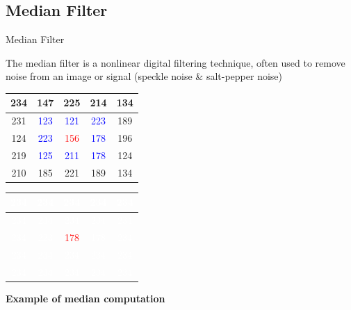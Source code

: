 \documentclass{beamer}
\begin{document}
\subsection{Median Filter}
\begin{frame}{Median Filter}

The median filter is a nonlinear digital filtering technique, often used to remove noise from an image or signal (speckle noise \& salt-pepper noise)




\begin{center}
		\begin{tabular}{|c|c|c|c|c|}
		\hline 
		234 & 147 & 225 & 214 & 134 \\ 
		\hline 
		231 & \textcolor{blue}{123} & \textcolor{blue}{121} & \textcolor{blue}{223} & 189 \\ 
		\hline 
		124 & \textcolor{blue}{223} & \textcolor{red}{156} & \textcolor{blue}{178} & 196 \\ 
		\hline 
		219 & \textcolor{blue}{125} & \textcolor{blue}{211} & \textcolor{blue}{178} & 124 \\ 
		\hline 
		210 & 185 & 221 & 189 & 134 \\ 
		\hline 
		\end{tabular}
	\end{center}

	\begin{center}
		\begin{tabular}{|c|c|c|c|c|}
		\hline 
		\textcolor{white}{234} & \textcolor{white}{234} & \textcolor{white}{234} & \textcolor{white}{234} & \textcolor{white}{234} \\ 
		\hline 
		\textcolor{white}{234} & \textcolor{white}{234} & \textcolor{white}{234} & \textcolor{white}{234} & \textcolor{white}{234} \\ 
		\hline 
		\textcolor{white}{234} & \textcolor{white}{223} & \textcolor{red}{178} & \textcolor{white}{178} & \textcolor{white}{234} \\ 
		\hline 
		\textcolor{white}{234} & \textcolor{white}{234} & \textcolor{white}{234} & \textcolor{white}{234} & \textcolor{white}{234} \\ 
		\hline 
		\textcolor{white}{234} & \textcolor{white}{234} & \textcolor{white}{234} & \textcolor{white}{234} & \textcolor{white}{234} \\ 
		\hline 
		\end{tabular}
\vspace{0.5cm}

\textbf{Example of median computation}
	\end{center}

\end{frame}
\end{document}
